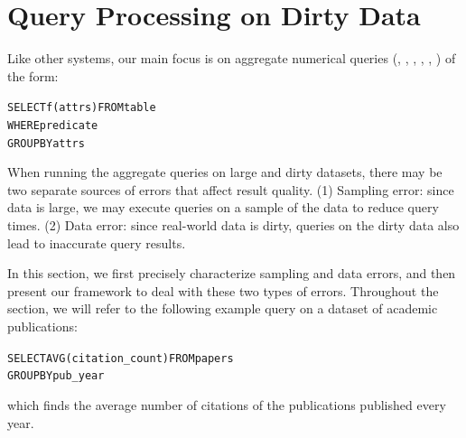 

\vspace{-.5em}
\section{Query Processing on Dirty Data}\label{sec:error}
Like other \saqp systems, our main focus is on aggregate numerical queries (\avgfunc, \sumfunc, \countfunc, \var, \geomeanfunc, \productfunc) of the form:
\begin{alltt}
SELECT \textsf{f}(attrs) FROM table \\WHERE predicate \\GROUP BY attrs
\end{alltt}
When running the aggregate queries on large and dirty datasets, there may be two separate sources of errors that affect result quality. (1) Sampling error: since data is large, we may execute queries on a sample of the data to reduce query times. (2) Data error: since real-world data is dirty, queries on the dirty data also lead to inaccurate query results. 

In this section, we first precisely characterize sampling and data errors, and then present our \saqpplus framework to deal with these two types of errors.
Throughout the section, we will refer to the following example query on a dataset of academic publications:
\begin{alltt}
SELECT \textsf{AVG}(citation_count) FROM papers \\GROUP BY pub_year
\end{alltt}
which finds the average number of citations of the publications published every year.

